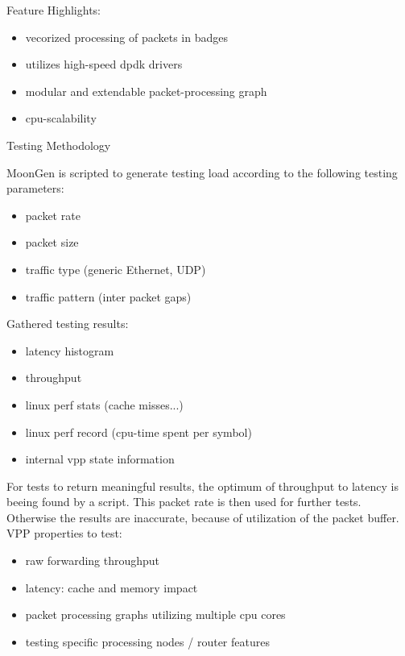 \documentclass[a1paper,fontsize=24.88pt,twoside=false,english,DIV=calc,NET]{scrartcl}
\begin{document}
{{{	Feature Highlights:
	\begin{itemize}
		\item vecorized processing of packets in badges
		\item utilizes high-speed dpdk drivers
		\item modular and extendable packet-processing graph
		\item cpu-scalability
	\end{itemize}
}{Testing Methodology}{
	\footnotesize
	MoonGen\cite{moongen-imc2015} is scripted to generate testing load according to the following testing parameters:
	\begin{itemize}
		\item packet rate
		\item packet size
		\item traffic type (generic Ethernet, UDP)
		\item traffic pattern (inter packet gaps)
	\end{itemize}
	\footnotesize
	Gathered testing results:
	\begin{itemize}
		\item latency histogram
		\item throughput
		\item linux perf stats (cache misses...)
		\item linux perf record (cpu-time spent per symbol)
		\item internal vpp state information
	\end{itemize}
	\footnotesize
	For tests to return meaningful results, the optimum of throughput to latency is beeing found by a script. This packet rate is then used for further tests. Otherwise the results are inaccurate, because of utilization of the packet buffer.  
	\footnotesize
	VPP properties to test:
	\begin{itemize}
		\item raw forwarding throughput
		\item latency: cache and memory impact
		\item packet processing graphs utilizing multiple cpu cores
		\item testing specific processing nodes / router features
	\end{itemize}
}

\vfill

}}
\end{document}
